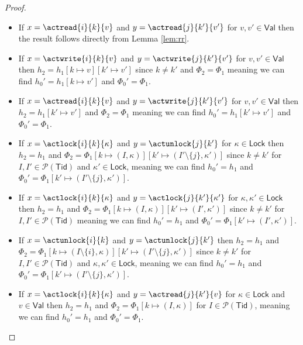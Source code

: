 \begin{proof}
\begin{itemize}
	\item If $x = \actread{i}{k}{v}$ and $y = \actread{j}{k'}{v'}$ for $v, v' \in \mathsf{Val}$ then the result follows directly from Lemma \ref{lem:rr}.
	
	\item If $x = \actwrite{i}{k}{v}$ and $y = \actwrite{j}{k'}{v'}$ for $v, v' \in \mathsf{Val}$ then $h_2 = h_1[k \mapsto v][k' \mapsto v']$ since $k \neq k'$ and $\Phi_2 = \Phi_1$ meaning we can find $h_0' = h_1[k \mapsto v']$ and $\Phi_0' = \Phi_1$.
	
	\item If $x = \actread{i}{k}{v}$ and $y = \actwrite{j}{k'}{v'}$ for $v, v' \in \mathsf{Val}$ then $h_2 = h_1[k' \mapsto v']$ and $\Phi_2 = \Phi_1$ meaning we can find $h_0' = h_1[k' \mapsto v']$ and $\Phi_0' = \Phi_1$.
	
	\item If $x = \actlock{i}{k}{\kappa}$ and $y = \actunlock{j}{k'}$ for $\kappa \in \mathsf{Lock}$ then $h_2 = h_1$ and $\Phi_2 = \Phi_1[k \mapsto (I, \kappa)][k' \mapsto (I' \setminus \{j\}, \kappa')]$ since $k \neq k'$ for $I, I' \in \mathcal{P}(\mathsf{Tid})$ and $\kappa' \in \mathsf{Lock}$, meaning we can find $h_0' = h_1$ and $\Phi_0' = \Phi_1[k' \mapsto (I' \setminus \{j\}, \kappa')]$.
	
	\item If $x = \actlock{i}{k}{\kappa}$ and $y = \actlock{j}{k'}{\kappa'}$ for $\kappa, \kappa' \in \mathsf{Lock}$ then $h_2 = h_1$ and $\Phi_2 = \Phi_1[k \mapsto (I, \kappa)][k' \mapsto (I', \kappa')]$ since $k \neq k'$ for $I, I' \in \mathcal{P}(\mathsf{Tid})$ meaning we can find $h_0' = h_1$ and $\Phi_0' = \Phi_1[k' \mapsto (I', \kappa')]$.
	
	\item If $x = \actunlock{i}{k}$ and $y = \actunlock{j}{k'}$ then $h_2 = h_1$ and $\Phi_2 = \Phi_1[k \mapsto (I \setminus \{i\}, \kappa)][k' \mapsto (I' \setminus \{j\}, \kappa')]$ since $k \neq k'$ for $I, I' \in \mathcal{P}(\mathsf{Tid})$ and $\kappa, \kappa' \in \mathsf{Lock}$, meaning we can find $h_0' = h_1$ and $\Phi_0' = \Phi_1[k' \mapsto (I' \setminus \{j\}, \kappa')]$.
	
	\item If $x = \actlock{i}{k}{\kappa}$ and $y = \actread{j}{k'}{v}$ for $\kappa \in \mathsf{Lock}$ and $v \in \mathsf{Val}$ then $h_2 = h_1$ and $\Phi_2 = \Phi_1[k \mapsto (I, \kappa)]$ for $I \in \mathcal{P}(\mathsf{Tid})$, meaning we can find $h_0' = h_1$ and $\Phi_0' = \Phi_1$.
	

\end{itemize}
\end{proof}
